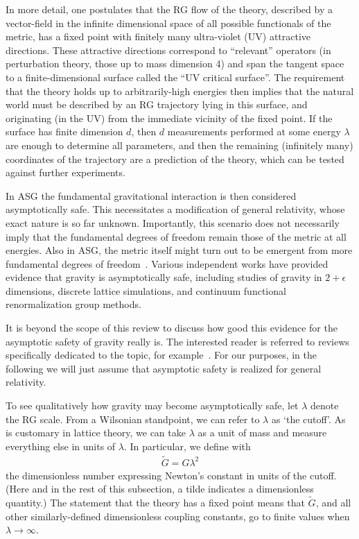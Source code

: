 \documentclass{article}
\def\beqn{\begin{eqnarray}}
\def\eeqn{\end{eqnarray}}
\begin{document}
In more detail, one postulates that the RG flow of the theory, 
described by a vector-field in the infinite dimensional space of all possible functionals
of the metric, has a fixed point with finitely many ultra-violet (UV) attractive directions.
These attractive directions correspond to ``relevant'' operators (in perturbation
theory, those up to mass
dimension 4) and span the
tangent space to a finite-dimensional surface called the ``UV critical surface''.
The requirement that the theory holds up to arbitrarily-high energies then 
implies that the natural world must be described by an RG trajectory lying in this
surface, and originating (in the UV) from the immediate vicinity of the fixed point. 
If the surface has finite dimension $d$, then $d$ measurements performed
at some energy $\lambda$ are enough to determine all parameters, and then the remaining
(infinitely many) coordinates of the trajectory are a prediction of the theory, which can be 
tested against further experiments.

In ASG the fundamental gravitational
interaction is then considered asymptotically safe. This necessitates a modification of general relativity,
whose exact nature is so far unknown. Importantly, this scenario does not necessarily imply that the
fundamental degrees of freedom remain those of the metric at all energies. Also in {\sc ASG}, the metric itself might
turn out to be emergent from more fundamental degrees of freedom~\cite{Percacci:2010af}. 
Various independent works have
provided evidence that gravity is asymptotically safe, including studies of gravity in $2+\epsilon$ dimensions,
discrete lattice simulations, and continuum functional renormalization group methods. 

It is beyond the scope of this review to discuss how good this evidence for the asymptotic safety of gravity really is. The interested
reader is referred to reviews specifically dedicated to the topic, for example~\cite{Niedermaier:2006wt,Litim:2008tt,Percacci:2007sz}. 
For our purposes, in the following we will just assume that asymptotic safety is realized for general 
relativity.

To see qualitatively how gravity may become asymptotically safe, let $\lambda$ 
denote the RG scale. From a Wilsonian standpoint, we can refer to $\lambda$
as `the cutoff'. As is customary in lattice theory, we can take $\lambda$ as a
unit of mass and measure everything else in units of $\lambda$.
In particular, we define with
\beqn
\tilde G=G \lambda^2
\eeqn
the dimensionless number expressing Newton's constant in units of the cutoff.
(Here and in the rest of this subsection, a tilde indicates a dimensionless quantity.)
The statement that the theory has a fixed point means that $\tilde G$,
and all other similarly-defined dimensionless coupling constants, 
go to finite values when $\lambda \to\infty$.
\end{document}

